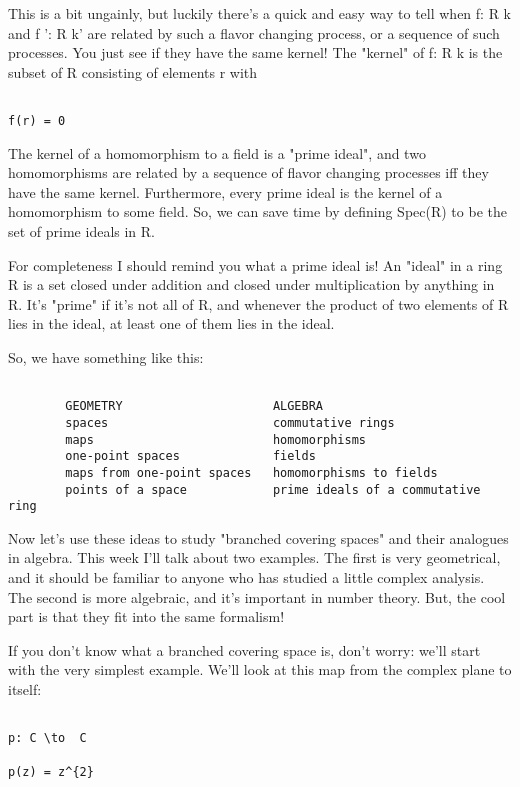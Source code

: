 This is a bit ungainly, but luckily there's a quick and easy way to tell 
when f: R \to  k and f ': R \to  k' are related by such a flavor changing 
process, or a sequence of such processes.  You just see if they have
the same kernel!  The "kernel" of f: R \to  k is the subset of R 
consisting of elements r with 


\begin{verbatim}

f(r) = 0
\end{verbatim}
    
The kernel of a homomorphism to a field is a "prime ideal", and two
homomorphisms are related by a sequence of flavor changing processes
iff they have the same kernel.  Furthermore, every prime ideal is
the kernel of a homomorphism to some field.  So, we can save time by
defining Spec(R) to be the set of prime ideals in R.  

For completeness I should remind you what a prime ideal is!  An 
"ideal" 
in a ring R is a set closed under addition and closed under multiplication 
by anything in R.  It's "prime" if it's not all of R, and whenever 
the product of two elements of R lies in the ideal, at least one of them 
lies in the ideal.  

So, we have something like this:


\begin{verbatim}

        GEOMETRY                     ALGEBRA
        spaces                       commutative rings
        maps                         homomorphisms
        one-point spaces             fields
        maps from one-point spaces   homomorphisms to fields
        points of a space            prime ideals of a commutative ring
\end{verbatim}
    
Now let's use these ideas to study "branched covering spaces" and 
their analogues in algebra.  This week I'll talk about two examples.  The first
is very geometrical, and it should be familiar to anyone who has studied 
a little complex analysis.   The second is more algebraic, and it's 
important in number theory.  But, the cool part is that they fit into 
the same formalism!

If you don't know what a branched covering space is, don't worry:
we'll start with the very simplest example.  We'll look at this map from 
the complex plane to itself:


\begin{verbatim}

p: C \to  C

p(z) = z^{2}
\end{verbatim}
    

